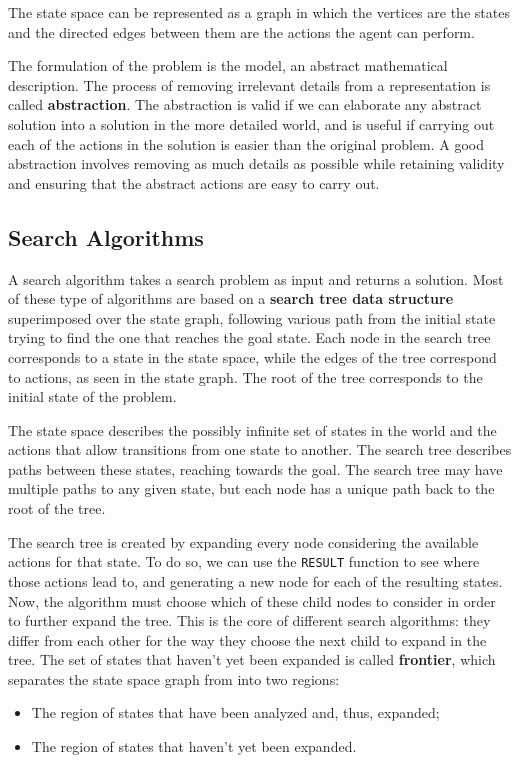 \documentclass{article}
\begin{document}
The state space can be represented as a graph in which the vertices are the states and the directed edges between them are the actions the agent can perform. 

The formulation of the problem is the model, an abstract mathematical description. The process of removing irrelevant details from a representation is called \textbf{abstraction}. The abstraction is valid if we can elaborate any abstract solution into a solution in the more detailed world, and is useful if carrying out each of the actions in the solution is easier than the original problem. A good abstraction involves removing as much details as possible while retaining validity and ensuring that the abstract actions are easy to carry out.

\subsection{Search Algorithms}
A search algorithm takes a search problem as input and returns a solution. Most of these type of algorithms are based on a \textbf{search tree data structure} superimposed over the state graph, following various path from the initial state trying to find the one that reaches the goal state. Each node in the search tree corresponds to a state in the state space, while the edges of the tree correspond to actions, as seen in the state graph. The root of the tree corresponds to the initial state of the problem. 

The state space describes the possibly infinite set of states in the world and the actions that allow transitions from one state to another. The search tree describes paths between these states, reaching towards the goal. The search tree may have multiple paths to any given state, but each node has a unique path back to the root of the tree. 

The search tree is created by expanding every node considering the available actions for that state. To do so, we can use the \lstinline{RESULT} function to see where those actions lead to, and generating a new node for each of the resulting states. Now, the algorithm must choose which of these child nodes to consider in order to further expand the tree. This is the core of different search algorithms: they differ from each other for the way they choose the next child to expand in the tree. The set of states that haven't yet been expanded is called \textbf{frontier}, which separates the state space graph from into two regions:
\begin{itemize}
    \item The region of states that have been analyzed and, thus, expanded;
    \item The region of states that haven't yet been expanded.
\end{itemize}
\end{document}
